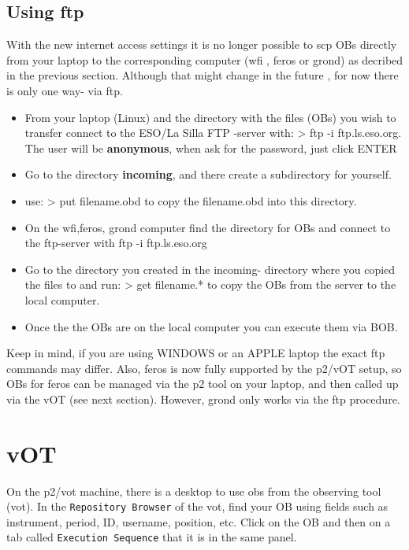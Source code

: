 \documentclass[11pt,fleqn,a4paper]{book}
\begin{document}
\subsection{Using ftp }
 With the new internet access settings it is no longer possible to scp OBs directly from your laptop to the corresponding computer (\gls{wfi} , \gls{feros} or \gls{grond}) as decribed in the previous section. Although that might change in the future , for now there is only one way- via ftp.
 \begin{itemize}
 	\item From your laptop (Linux)  and the directory with the files (OBs) you wish to transfer connect to the ESO/La Silla FTP -server with: > ftp -i ftp.ls.eso.org. The user will be {\bf{anonymous}}, when ask for the password, just click ENTER
 	\item Go to the directory {\bf{incoming}}, and there create a subdirectory for yourself. 
 	\item use: > put filename.obd  to copy the filename.obd into this directory.
 	\item On the \gls{wfi},\gls{feros}, \gls{grond} computer find the directory for OBs and connect to the ftp-server with ftp -i ftp.ls.eso.org
 	\item Go to the directory you created in the incoming- directory where you copied the files to and run: > get filename.* to copy the OBs from the server to the local computer.
 	\item Once the the OBs are on the local computer you can execute them  via BOB.
 \end{itemize}
 
 Keep in mind, if you are using WINDOWS or an APPLE laptop the exact ftp commands may differ. Also, \gls{feros} is now fully supported by the p2/vOT setup, so OBs for \gls{feros} can be managed via the p2 tool on your laptop, and then called up via the vOT (see next section). However,  \gls{grond} only works via the ftp procedure.
 
\section{vOT}

On the \gls{p2}/\gls{vot} machine, there is a \gls{desktop} to use \glspl{ob} from the observing tool (\gls{vot}). In the \texttt{Repository Browser} of the \gls{vot}, find your OB using fields such as instrument, period, ID, username, position, etc.  Click on the OB and then on a tab called \texttt{Execution Sequence} that it is in the same panel.
\end{document}
